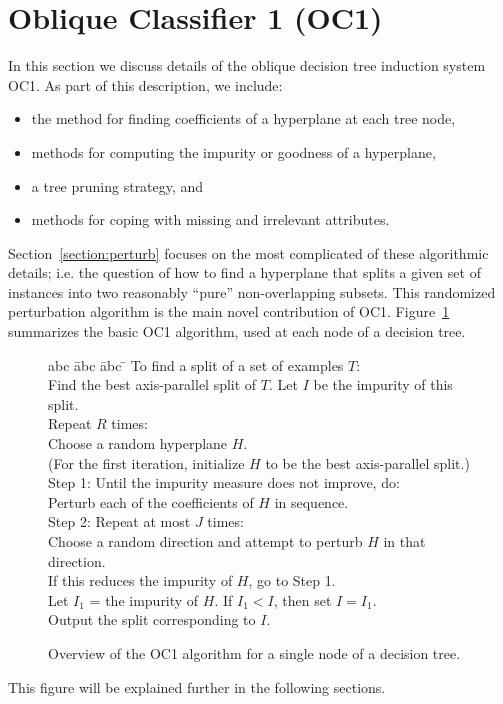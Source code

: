 \section{Oblique Classifier 1 (OC1)}
\label{section:oc1}
In this section we discuss details of the oblique decision tree
induction system OC1.  As part of this description, we include:
\begin{itemize}
\itemsep -0.0in
\item the method for finding coefficients of a hyperplane at each 
tree node,
\item methods for computing the impurity or goodness of a hyperplane,
\item a tree pruning strategy, and
\item methods for coping with missing and irrelevant attributes.
\end{itemize} 
Section~\ref{section:perturb} focuses on the most complicated of
these algorithmic details; i.e. the question of how to find a
hyperplane that splits a given set of instances into two reasonably
``pure'' non-overlapping subsets.  This randomized perturbation
algorithm is the main novel contribution of OC1\@.
Figure~\ref{figure:oc1-alg} summarizes the basic OC1 algorithm, used
at each node of a decision tree.
\begin{figure}
{\small
{\bf
\begin{tabbing}
abc \= abc \= abc \= \kill
To find a split of a set of examples $T$: \\
   \> Find the best axis-parallel split of $T$.  Let $I$ be the
      impurity of this split. \\
   \> Repeat $R$ times: \\
   \> \> Choose a random hyperplane $H$. \\
   \> \> (For the first iteration, initialize $H$ to be the best 
axis-parallel split.) \\
   \> \> Step 1: Until the impurity measure does not improve, do: \\
   \> \> \> Perturb each of the coefficients of $H$ in sequence. \\
   \> \> Step 2: Repeat at most $J$ times: \\
   \> \> \> Choose a random direction and attempt to perturb $H$ in 
            that direction. \\
   \> \> \> If this reduces the impurity of $H$, go to Step 1. \\
   \> \> Let $I_1$ = the impurity of $H$.  If $I_1 < I$, then set $I=I_1$. \\
   \> Output the split corresponding to $I$.
\end{tabbing}
}
}
\vspace*{-.2in} 
\caption{Overview of the OC1 algorithm for a single node of a decision tree.}
\label{figure:oc1-alg}
\end{figure}
This figure will be explained further in the following sections.

